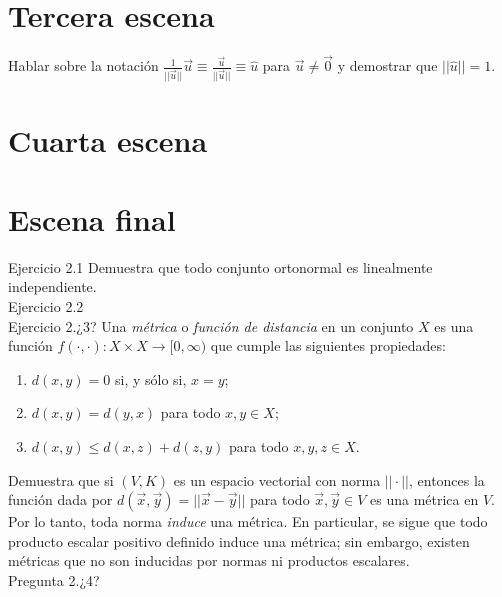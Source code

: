 \documentclass[12pt,dvipsnames]{article}
\numberwithin{equation}{section}
\begin{document}

\newpage
\section{Tercera escena}

Hablar sobre la notación $\frac{1}{||\vec{u}||}\vec{u}\equiv \frac{\vec{u}}{||\vec{u}||}\equiv \hat{u}$ para $\vec{u}\neq\vec{0}$ y demostrar que $||\hat{u}|| = 1$.


\newpage
\section{Cuarta escena}


\newpage
\section{Escena final}


Ejercicio 2.1 Demuestra que todo conjunto ortonormal es linealmente independiente. \\

Ejercicio 2.2 \\

Ejercicio 2.¿3? Una \emph{métrica} o \emph{función de distancia} en un conjunto $X$ es una función $f(\cdot, \cdot ):X\times X\to [0,\infty)$ que cumple las siguientes propiedades:
\begin{enumerate}[label=(\roman*)]
    \item $d(x,y)=0$ si, y sólo si, $x=y$;

    \item $d(x,y)=d(y,x)$ para todo $x,y\in X$;

    \item $d(x,y) \le d(x,z) + d(z,y)$ para todo $x,y,z\in X$.
\end{enumerate}

\noindent Demuestra que si $(V,K)$ es un espacio vectorial con norma $||\cdot||$, entonces la función dada por $d(\vec{x},\vec{y})=||\vec{x}-\vec{y}||$ para todo $\vec{x},\vec{y}\in V$ es una métrica en $V$. Por lo tanto, toda norma \emph{induce} una métrica. En particular, se sigue que todo producto escalar positivo definido induce una métrica; sin embargo, existen métricas que no son inducidas por normas ni productos escalares. \\

Pregunta 2.¿4?
\end{document}
